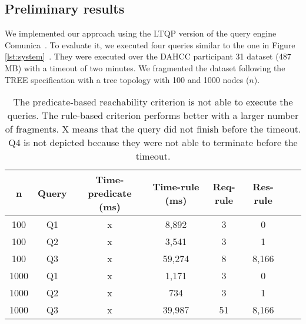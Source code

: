 \subsection{Preliminary results}

We implemented our approach using the LTQP version of the query engine Comunica~\cite{comunica}.
To evaluate it, we executed four queries similar to the one in Figure \ref{lst:system}~.
They were executed over the DAHCC participant 31 dataset (487 MB) with a timeout of two minutes.
We fragmented the dataset following the TREE specification with a tree topology with 100 and 1000 nodes ($n$).


\begin{table}[ht]
    \centering
    \begin{tabular}{|c|c|c|c|c|c|c|c|}
        \hline
        \textbf{n} & \textbf{Query} & \textbf{Time-predicate (ms)}  & \textbf{Time-rule (ms)} & \textbf{Req-rule} & \textbf{Res-rule} \\
        \hline
        100 & Q1 & x & 8,892& 3 & 0 \\
        100 & Q2 & x & 3,541& 3 & 1 \\
        100 & Q3 & x & 59,274& 8 & 8,166 \\
        \hhline{|=|=|=|=|=|=|=|=|}
        1000 & Q1 & x & 1,171& 3 & 0 \\
        1000 & Q2 & x & 734& 3 & 1 \\
        1000 & Q3 & x & 39,987& 51 & 8,166 \\
        \hline
    \end{tabular}
    \caption{
    The predicate-based reachability criterion is not able to execute the queries. 
    The rule-based criterion performs better with a larger number of fragments.
    X means that the query did not finish before the timeout.
    Q4 is not depicted because they were not able to terminate before the timeout.}
    \label{tab:result}
\end{table}

